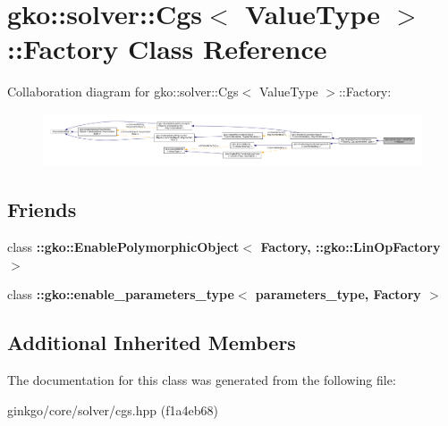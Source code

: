 \hypertarget{classgko_1_1solver_1_1Cgs_1_1Factory}{}\section{gko\+:\+:solver\+:\+:Cgs$<$ Value\+Type $>$\+:\+:Factory Class Reference}
\label{classgko_1_1solver_1_1Cgs_1_1Factory}


Collaboration diagram for gko\+:\+:solver\+:\+:Cgs$<$ Value\+Type $>$\+:\+:Factory\+:
\nopagebreak
\begin{figure}[H]
\begin{center}
\leavevmode
\includegraphics[width=350pt]{classgko_1_1solver_1_1Cgs_1_1Factory__coll__graph}
\end{center}
\end{figure}
\subsection*{Friends}
\begin{DoxyCompactItemize}
\item 
\mbox{\label{classgko_1_1solver_1_1Cgs_1_1Factory_a27e9bbc94a1c1c59f40833153eda8f78}} 
class {\bfseries \+::gko\+::\+Enable\+Polymorphic\+Object$<$ Factory, \+::gko\+::\+Lin\+Op\+Factory $>$}
\item 
\mbox{\label{classgko_1_1solver_1_1Cgs_1_1Factory_a0d176cbd42d6214e11aee8c30ca256fc}} 
class {\bfseries \+::gko\+::enable\+\_\+parameters\+\_\+type$<$ parameters\+\_\+type, Factory $>$}
\end{DoxyCompactItemize}
\subsection*{Additional Inherited Members}


The documentation for this class was generated from the following file\+:\begin{DoxyCompactItemize}
\item 
ginkgo/core/solver/cgs.\+hpp (f1a4eb68)\end{DoxyCompactItemize}
